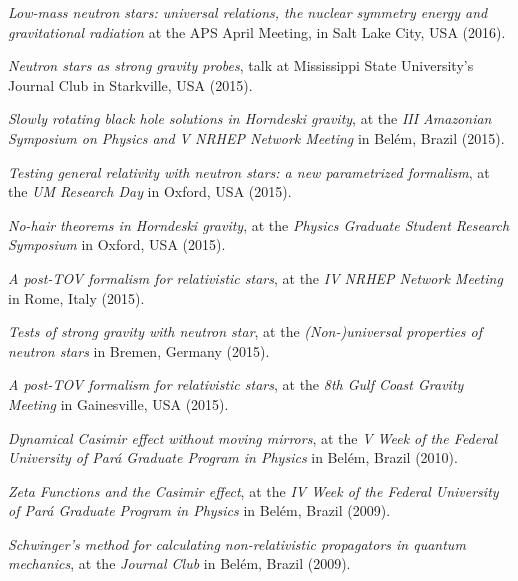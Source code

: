 \documentclass[10pt]{article}
\newcommand{\invited}{{\color{aeilbl}{invited}}}
\begin{document}
\begin{bibenum}
    \item
    \emph{Low-mass neutron stars: universal relations, the nuclear symmetry energy and gravitational radiation}
    at the {APS April Meeting},
    in Salt Lake City, USA (2016).

    \item
    \emph{Neutron stars as strong gravity probes},
    \invited{} talk at Mississippi State University's Journal Club
    in Starkville, USA (2015).

    \item
    \emph{Slowly rotating black hole solutions in Horndeski gravity},
    at the \emph{III Amazonian Symposium on Physics and V NRHEP Network Meeting}
    in Bel\'em, Brazil (2015).

    \item
    \emph{Testing general relativity with neutron stars: a new
    parametrized formalism},
    at the \emph{UM Research Day}
    in Oxford, USA (2015).

    \item
    \emph{No-hair theorems in Horndeski gravity},
    at the \emph{Physics Graduate Student Research Symposium}
    in Oxford, USA (2015).

    \item
    \emph{A post-TOV formalism for relativistic stars},
    at the \emph{IV NRHEP Network Meeting}
    in Rome, Italy (2015).

    \item
    \emph{Tests of strong gravity with neutron star},
    at the \emph{(Non-)universal properties of neutron stars}
    in Bremen, Germany (2015).

    \item
    \emph{A post-TOV formalism for relativistic stars},
    at the \emph{8th Gulf Coast Gravity Meeting}
    in Gainesville, USA (2015).

    \item
    \emph{Dynamical Casimir effect without moving mirrors},
    at the \emph{V Week of the Federal University of Par\'a Graduate Program in Physics}
    in Bel\'em, Brazil (2010).

    \item
    \emph{Zeta Functions and the Casimir effect},
    at the \emph{IV Week of the Federal University of Par\'a Graduate Program in Physics}
    in Bel\'em, Brazil (2009).

    \item
    \emph{Schwinger's method for calculating non-relativistic
    propagators in quantum mechanics},
    at the \emph{Journal Club}
    in Bel\'em, Brazil (2009).


\end{bibenum}
\end{document}
